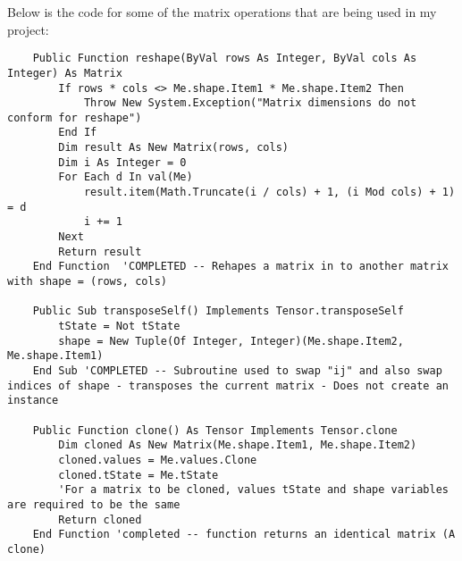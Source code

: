 Below is the code for some of the matrix operations that are being used in my project: 
\begin{verbatim}
    Public Function reshape(ByVal rows As Integer, ByVal cols As Integer) As Matrix
        If rows * cols <> Me.shape.Item1 * Me.shape.Item2 Then
            Throw New System.Exception("Matrix dimensions do not conform for reshape")
        End If
        Dim result As New Matrix(rows, cols)
        Dim i As Integer = 0
        For Each d In val(Me)
            result.item(Math.Truncate(i / cols) + 1, (i Mod cols) + 1) = d
            i += 1
        Next
        Return result
    End Function  'COMPLETED -- Rehapes a matrix in to another matrix with shape = (rows, cols)
    
    Public Sub transposeSelf() Implements Tensor.transposeSelf
        tState = Not tState
        shape = New Tuple(Of Integer, Integer)(Me.shape.Item2, Me.shape.Item1)
    End Sub 'COMPLETED -- Subroutine used to swap "ij" and also swap indices of shape - transposes the current matrix - Does not create an instance

    Public Function clone() As Tensor Implements Tensor.clone
        Dim cloned As New Matrix(Me.shape.Item1, Me.shape.Item2)
        cloned.values = Me.values.Clone
        cloned.tState = Me.tState
        'For a matrix to be cloned, values tState and shape variables are required to be the same
        Return cloned
    End Function 'completed -- function returns an identical matrix (A clone)
    

\end{verbatim}
